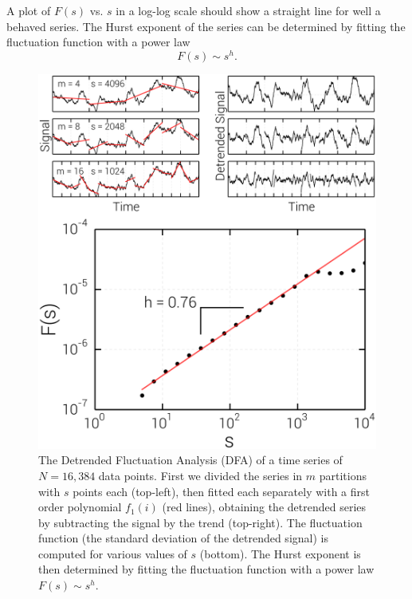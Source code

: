 A plot of $F(s)$ vs. $s$ in a log-log scale should show a straight line
for well a behaved series. %
The Hurst exponent of the series can be determined by fitting the fluctuation
function with a power law
\begin{equation}
    F(s)\sim s^h.
\end{equation}

\begin{figure}[t]
    \begin{center}
        \includegraphics[scale=0.25]{chapters/ch6-asle/figs/dfa}
    \end{center}
    \caption{The Detrended Fluctuation Analysis (DFA) of a time series of
        $N=16,384$ data points. First we divided the series in $m$ partitions with
        $s$ points each (top-left), then fitted each separately with a first order
        polynomial $f_1(i)$ (red lines), obtaining the detrended series by subtracting
        the signal by the trend (top-right).  The fluctuation function (the standard
        deviation of the detrended signal) is computed for various values of $s$
        (bottom).  The Hurst exponent is then determined by fitting the fluctuation
        function with a power law $F(s)\sim s^h$.}
\label{fig:dfa}
\end{figure}

